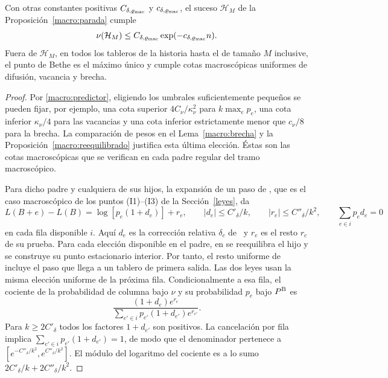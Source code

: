 \begin{corolario}\label{macro:cambio}
Con otras constantes positivas $C_{\delta,\varrho_{\rm mac}}$ y $c_{\delta,\varrho_{\rm mac}}$, el
suceso $\mathcal H_M$ de la Proposición~\ref{macro:parada} cumple
\[
 \nu(\mathcal H_M)\le C_{\delta,\varrho_{\rm mac}}\exp(-c_{\delta,\varrho_{\rm mac}}n).
\]
Fuera de $\mathcal H_M$, en todos los tableros de la historia hasta el de tamaño $M$ inclusive, el
punto de Bethe es el máximo único y cumple cotas macroscópicas uniformes de difusión, vacancia y
brecha.
\end{corolario}
\begin{proof}
Por \eqref{macro:predictor}, eligiendo los umbrales suficientemente pequeños se pueden fijar, por
ejemplo, una cota superior $4C_\nu/\kappa_\nu^2$ para $k\max_e p_e$, una cota inferior $\kappa_\nu/4$
para las vacancias y una cota inferior estrictamente menor que $c_\nu/8$ para la brecha. La
comparación de pesos en el Lema~\ref{macro:brecha} y la Proposición~\ref{macro:reequilibrado}
justifica esta última elección. Éstas son las cotas macroscópicas que se verifican en cada padre
regular del tramo macroscópico.

Para dicho padre y cualquiera de sus hijos, la expansión de un paso de \cite[Teorema~7.1 y
Corolario~7.2, con sus pruebas]{pred}, que es el caso macroscópico de los puntos (I1)--(I3) de la
Sección~\ref{leyes}, da
\[
 L(B+e)-L(B)=\log[p_e(1+d_e)]+r_e,\qquad
 |d_e|\le C'_\delta/k,\qquad |r_e|\le C''_\delta/k^2,\qquad
 \sum_{e\in i}p_ed_e=0
\]
en cada fila disponible $i$. Aquí $d_e$ es la corrección relativa $\delta_c$
de~\cite[Teorema~7.1]{pred} y $r_e$ es el resto $r_c$ de su prueba. Para cada elección disponible en
el padre, en \cite[Secciones~6.5 y~7.2]{pred} se reequilibra el hijo y se construye su punto
estacionario interior. Por tanto, el resto uniforme de \cite[Sección~7.8]{pred} incluye el paso que
llega a un tablero de primera salida. Las dos leyes usan la misma elección uniforme de la próxima fila.
Condicionalmente a esa fila, el cociente de la probabilidad de columna bajo $\nu$ y su probabilidad
$p_e$ bajo $P^{\rm B}$ es
\[
 \frac{(1+d_e)e^{r_e}}{\sum_{e'\in i}p_{e'}(1+d_{e'})e^{r_{e'}}} .
\]
Para $k\ge2C'_\delta$ todos los factores $1+d_{e'}$ son positivos. La cancelación por fila implica
$\sum_{e'\in i}p_{e'}(1+d_{e'})=1$, de modo que el denominador pertenece a
$[e^{-C''_\delta/k^2},e^{C''_\delta/k^2}]$. El módulo del logaritmo del cociente es a lo sumo
$2C'_\delta/k+2C''_\delta/k^2$.


\end{proof}
